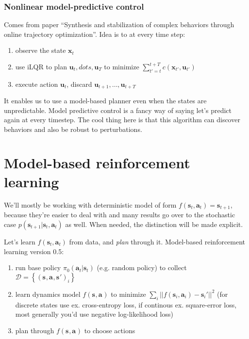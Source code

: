 \documentclass{report}
\begin{document}
\subsection{Nonlinear model-predictive control}
Comes from paper ``Synthesis and stabilization of complex behaviors through online trajectory optimization''.
Idea is to at every time step:
\begin{enumerate}
		\item observe the state $ \bm{x}_{t}  $
		\item use iLQR to plan $ \bm{u}_{t}, dots, \bm{u}_{T}  $ to minimize $ \sum_{t'=t}^{t+T} c (\bm{x}_{t'}, \bm{u}_{t'} )  $
		\item execute action $ \bm{u}_{t}  $, discard $ \bm{u}_{t+1}, \dots, \bm{u}_{t+T}  $
\end{enumerate}
It enables us to use a model-based planner even when the states are unpredictable.
Model predictive control is a fancy way of saying let's predict again at every timestep.
The cool thing here is that this algorithm can discover behaviors and also
be robust to perturbations.



















\chapter{Model-based reinforcement learning}
We'll mostly be working with deterministic model of form $f (\bm{s}_{t}, \bm{a}_{t} ) = \bm{s}_{t+1} $,
because they're easier to deal with and many results go over to the stochastic case 
$p(\bm{s}_{t+1} | \bm{s}_t, \bm{a}_t)$
as well. When needed, the distinction will be made explicit.

Let's learn $ f (\bm{s}_{t}, \bm{a}_{t} )$ from data, and \textit{plan} through it.
Model-based reinforcement learning version 0.5:
\begin{enumerate}
		\item run base policy $ \pi_0 (\bm{a}_t| \bm{s}_t)  $ (e.g. random policy) to collect $ \mathcal{D} = \left\{ \left( \bm{s}_{}, \bm{a}_{}, \bm{s}_{}' \right)_i  \right\}  $ 
		\item learn dynamics model $f(\bm{s}_{}, \bm{a}_{})$ to minimize $ \sum_{i}^{} || f (\bm{s}_{i}, \bm{a}_{i} ) - \bm{s}_{i}'||^2$ 
				(for discrete states use ex. cross-entropy loss, if continous ex. square-error loss, most generally you'd use negative log-likelihood loss)
		\item plan through $f(\bm{s}_{}, \bm{a}_{})$ to choose actions
\end{enumerate}
\end{document}
